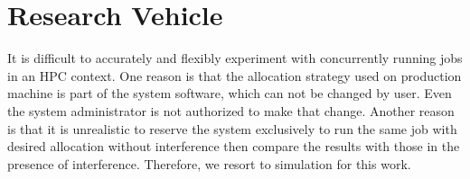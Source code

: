 \documentclass[conference]{IEEEtran}
\begin{document}
%
%
%       






\section{Research Vehicle}
\label{sec:codes}

It is difficult to accurately and flexibly experiment with concurrently running jobs in an HPC context. One reason is that the allocation strategy used on production machine is part of the system software, which can not be changed by user. Even the system administrator is not authorized to make that change. Another reason is that it is unrealistic to reserve the system exclusively to run the same job with desired allocation without interference then compare the results with those in the presence of interference. Therefore, we resort to simulation for this work.
\end{document}
